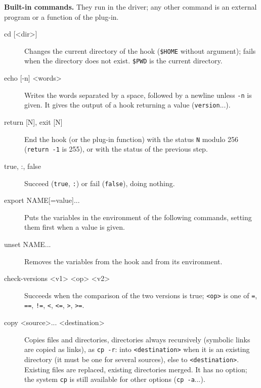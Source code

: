 \documentclass[a4paper,12pt,twoside]{article}
\newcommand{\code}[1]{\texttt{#1}}
\begin{document}
\textbf{Built-in commands.} 
They run in the driver; any other command is an external program or a
function of the plug-in.

\begin{description}
	\item[cd {[<dir>]}] Changes the current directory of the hook
	(\code{\$HOME} without argument); fails when the directory does not
	exist. \code{\$PWD} is the current directory.
	\item[echo {[-n]} <words>] Writes the words separated by a
	space, followed by a newline unless \code{-n} is given. It gives the
	output of a hook returning a value (\code{version}...).
	\item[return {[N]}, exit {[N]}] End the
	hook (or the plug-in function) with the status \code{N} modulo 256
	(\code{return -1} is 255), or with the status of the previous step.
	\item[true, :, false] Succeed (\code{true}, \code{:}) or fail
	(\code{false}), doing nothing.
	\item[export NAME{[=value]}...] Puts the variables in
	the environment of the following commands, setting them first when a
	value is given.
	\item[unset NAME...] Removes the variables from the hook
	and from its environment.
	\item[check-versions <v1> <op> <v2>] Succeeds
	when the comparison of the two versions is true; \code{<op>} is one of
	\code{=}, \code{==}, \code{!=}, \code{<}, \code{<=}, \code{>},
	\code{>=}.
	\item[copy <source>... <destination>] Copies files and
	directories, directories always recursively (symbolic links are
	copied as links), as \code{cp -r}: into \code{<destination>} when it
	is an existing directory (it must be one for several sources), else to
	\code{<destination>}. Existing files are replaced, existing
	directories merged. It has no option; the system \code{cp} is still
	available for other options (\code{cp -a}...).


\end{description}
\end{document}
